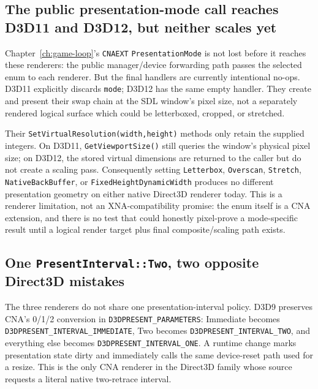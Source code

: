 \subsection{The public presentation-mode call reaches D3D11 and D3D12, but neither scales yet}

Chapter~\ref{ch:game-loop}'s \texttt{CNAEXT} \texttt{Presentation\allowbreak{}Mode} is not lost before it
reaches these renderers: the public manager/device forwarding path passes the selected enum to each
renderer. But the final handlers are
currently intentional no-ops. D3D11 explicitly discards \texttt{mode}; D3D12 has the same
empty handler. They create and present their swap chain at the SDL window's pixel size,
not a separately rendered logical surface which could be letterboxed, cropped, or stretched.

Their \texttt{SetVirtualResolution(width,height)} methods only retain the supplied integers.
On D3D11, \texttt{GetViewportSize()} still queries the window's physical pixel size; on D3D12,
the stored virtual dimensions are returned to the caller but do not create a scaling pass.
Consequently setting \texttt{Letterbox}, \texttt{Overscan}, \texttt{Stretch},
\texttt{NativeBackBuffer}, or \texttt{FixedHeightDynamicWidth} produces no different
presentation geometry on either native Direct3D renderer today. This is a renderer limitation,
not an XNA-compatibility promise: the enum itself is a CNA extension, and there is no test that
could honestly pixel-prove a mode-specific result until a logical render target plus final
composite/scaling path exists.

\subsection{One \texttt{PresentInterval::Two}, two opposite Direct3D mistakes}

The three renderers do not share one presentation-interval policy. D3D9 preserves CNA's
0/1/2 conversion in \texttt{D3DPRESENT\_}\allowbreak\texttt{PARAMETERS}: Immediate becomes
\texttt{D3DPRESENT\_}\allowbreak\texttt{INTERVAL\_}\allowbreak\texttt{IMMEDIATE}, Two becomes
\texttt{D3DPRESENT\_}\allowbreak\texttt{INTERVAL\_}\allowbreak\texttt{TWO}, and everything
else becomes \texttt{D3DPRESENT\_}\allowbreak\texttt{INTERVAL\_}\allowbreak\texttt{ONE}.
A runtime change marks presentation state dirty and
immediately calls the same device-reset path used for a resize. This is the only CNA renderer
in the Direct3D family whose source requests a literal native two-retrace interval.

